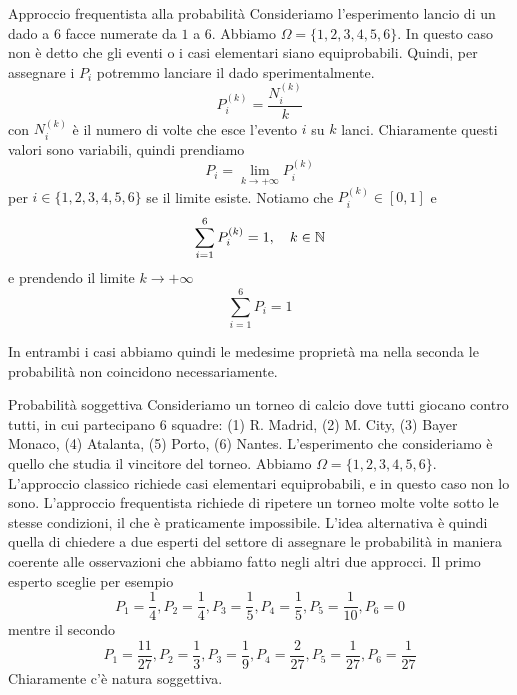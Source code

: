 \documentclass[a4paper]{article}
\begin{document}
\begin{radioactive}
    \begin{snippetexample}{Approccio frequentista alla probabilità}
        Consideriamo l'esperimento lancio di un dado
        a 6 facce numerate da \(1\) a \(6\).
        Abbiamo \(\Omega = \{1,2,3,4,5,6\}\).
        In questo caso non è detto che gli eventi o i casi elementari
        siano equiprobabili. Quindi,
        per assegnare i \(P_i\) potremmo lanciare il dado sperimentalmente.
        \[
            P_i^{(k)} = \frac{N_i^{(k)}}{k}
        \]
        con \(N_i^{(k)}\) è il numero di volte che esce l'evento \(i\) su \(k\) lanci.
        Chiaramente questi valori sono variabili, quindi prendiamo
        \[
            P_i = \lim_{k \to +\infty} P^{(k)}_i
        \]
        per  \(i \in \{1,2,3,4,5,6\}\) se il limite esiste.
        Notiamo che \(P_i^{(k)} \in [0,1]\) e
        \[
            \sum_{i=1}^6 P_i^{(k)} = 1, \quad k \in \mathbb{N}
        \]
        e prendendo il limite \(k \to +\infty\)
        \[
            \sum_{i=1}^6 P_i = 1
        \]
    \end{snippetexample}
\end{radioactive}

\begin{radioactive}
    In entrambi i casi abbiamo quindi le medesime proprietà
    ma nella seconda le probabilità non coincidono necessariamente.
\end{radioactive}

\begin{radioactive}
    \begin{snippetexample}{Probabilità soggettiva}
        Consideriamo un torneo di calcio dove tutti giocano contro tutti, in cui partecipano 6 squadre:
        (1) R. Madrid, (2) M. City, (3) Bayer Monaco, (4) Atalanta, (5) Porto, (6) Nantes.
        L'esperimento che consideriamo è quello che studia il vincitore del torneo.
        Abbiamo \(\Omega = \{1,2,3,4,5,6\}\).
        L'approccio classico richiede casi elementari equiprobabili, e in questo caso non lo sono.
        L'approccio frequentista richiede di ripetere un torneo molte volte sotto le stesse condizioni,
        il che è praticamente impossibile.
        L'idea alternativa è quindi quella di chiedere a due esperti del settore
        di assegnare le probabilità in maniera coerente alle osservazioni che abbiamo
        fatto negli altri due approcci.
        Il primo esperto sceglie per esempio \[
            P_1 = \frac14,
            P_2 = \frac14,
            P_3 = \frac15,
            P_4 = \frac15,
            P_5 = \frac{1}{10},
            P_6 = 0
        \]
        mentre il secondo \[
            P_1 = \frac{11}{27},
            P_2 = \frac13,
            P_3 = \frac19,
            P_4 = \frac{2}{27},
            P_5 = \frac{1}{27},
            P_6 = \frac{1}{27}
        \]
        Chiaramente c'è natura soggettiva.
    \end{snippetexample}
\end{radioactive}
\end{document}
